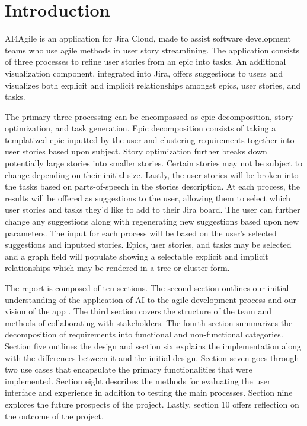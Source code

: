 \section{Introduction}
AI4Agile is an application for Jira Cloud, made to assist software development teams who use agile methods in user story streamlining. The application consists of three processes to refine user stories from an epic into tasks. An additional visualization component, integrated into Jira, offers suggestions to users and visualizes both explicit and implicit relationships amongst epics, user stories, and tasks.

The primary three processing can be encompassed as epic decomposition, story optimization, and task generation. Epic decomposition consists of taking a templatized epic inputted by the user and clustering requirements together into user stories based upon subject. Story optimization further breaks down potentially large stories into smaller stories. Certain stories may not be subject to change depending on their initial size. Lastly, the user stories will be broken into the tasks based on parts-of-speech in the stories description. At each process, the results will be offered as suggestions to the user, allowing them to select which user stories and tasks they’d like to add to their Jira board. The user can further change any suggestions along with regenerating new suggestions based upon new parameters. The input for each process will be based on the user’s selected suggestions and inputted stories. Epics, user stories, and tasks may be selected and a graph field will populate showing a selectable explicit and implicit relationships which may be rendered in a tree or cluster form.

The report is composed of ten sections. The second section outlines our initial understanding of the application of AI to the agile development process and our vision of the app . The third section covers the structure of the team and methods of collaborating with stakeholders. The fourth section summarizes the decomposition of requirements into functional and non-functional categories. Section five outlines the design and section six explains the implementation along with the differences between it and the initial design. Section seven goes through two use cases that encapsulate the primary functionalities that were implemented. Section eight describes the methods for evaluating the user interface and experience in addition to testing the main processes. Section nine explores the future prospects of the project. Lastly, section 10 offers reflection on the outcome of the project.

